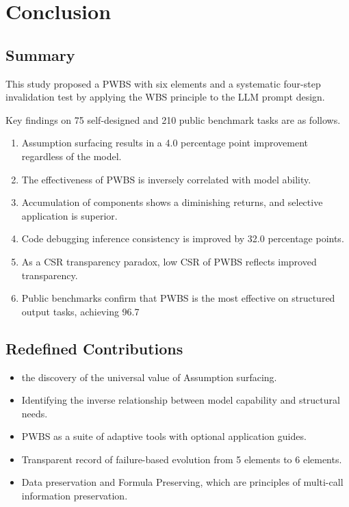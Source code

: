 \documentclass[11pt,a4paper]{article}
\begin{document}
\section{Conclusion}

\subsection{Summary}

This study proposed a PWBS with six elements and a systematic four-step invalidation test by applying the WBS principle to the LLM prompt design.

Key findings on 75 self-designed and 210 public benchmark tasks are as follows.

\begin{enumerate}[leftmargin=2em]
  \item Assumption surfacing results in a 4.0 percentage point improvement regardless of the model.
  \item The effectiveness of PWBS is inversely correlated with model ability.
  \item Accumulation of components shows a diminishing returns, and selective application is superior.
  \item Code debugging inference consistency is improved by 32.0 percentage points.
  \item As a CSR transparency paradox, low CSR of PWBS reflects improved transparency.
  \item Public benchmarks confirm that PWBS is the most effective on structured output tasks, achieving 96.7%
\end{enumerate}

\subsection{Redefined Contributions}

\begin{itemize}[leftmargin=2em]
  \item the discovery of the universal value of Assumption surfacing.
  \item Identifying the inverse relationship between model capability and structural needs.
  \item PWBS as a suite of adaptive tools with optional application guides.
  \item Transparent record of failure-based evolution from 5 elements to 6 elements.
  \item Data preservation and Formula Preserving, which are principles of multi-call information preservation.
\end{itemize}
\end{document}
